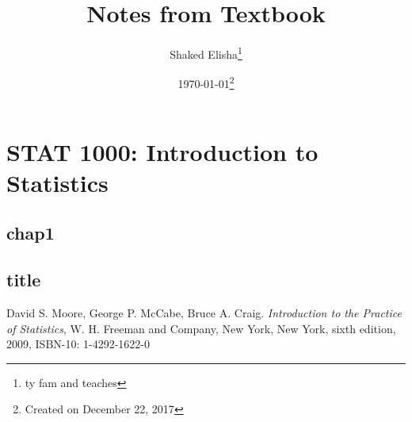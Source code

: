 \documentclass[letterpaper,10pt,oneside,final,openbib]{memoir} %
\title{Notes from Textbook}
\author{Shaked Elisha\thanks{ty fam and teaches}}
\date{\today\thanks{Created on December 22, 2017}}
\begin{document}
\maketitle

\frontmatter

\tableofcontents

\mainmatter


\part{STAT 1000: Introduction to Statistics~\texorpdfstring{\cite{intstat}}{}}
\chapter{chap1}


 

\appendix
\chapter{title}

\backmatter

\listoffigures
\listoftables


\begin{thebibliography}{200}
	 David S. Moore, George P. McCabe, Bruce A. Craig. \emph{Introduction to the Practice of Statistics}, W. H. Freeman and Company, New York, New York, sixth edition, 2009, ISBN-10: 1-4292-1622-0
\end{thebibliography}

\printindex
\end{document}
